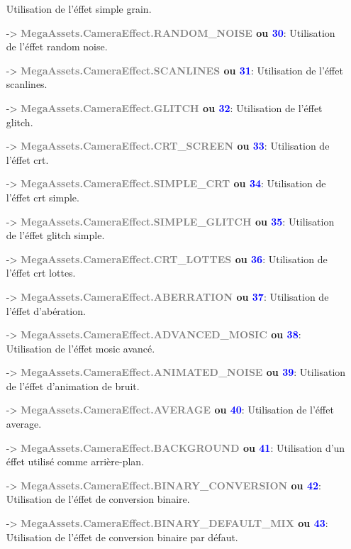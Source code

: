 \documentclass[a4paper, 11pt]{article}
\begin{document}
\begin{itemize}
		Utilisation de l'éffet simple grain.
		\item [-> \textbf{\textcolor{gray}{MegaAssets.CameraEffect.RANDOM\_NOISE} ou \textcolor{blue}{30}}:] 
		Utilisation de l'éffet random noise.
		\item [-> \textbf{\textcolor{gray}{MegaAssets.CameraEffect.SCANLINES} ou \textcolor{blue}{31}}:] 
		Utilisation de l'éffet scanlines.
		\item [-> \textbf{\textcolor{gray}{MegaAssets.CameraEffect.GLITCH} ou \textcolor{blue}{32}}:] 
		Utilisation de l'éffet glitch.
		\item [-> \textbf{\textcolor{gray}{MegaAssets.CameraEffect.CRT\_SCREEN} ou \textcolor{blue}{33}}:] 
		Utilisation de l'éffet crt.
		\item [-> \textbf{\textcolor{gray}{MegaAssets.CameraEffect.SIMPLE\_CRT} ou \textcolor{blue}{34}}:] 
		Utilisation de l'éffet crt simple.
		\item [-> \textbf{\textcolor{gray}{MegaAssets.CameraEffect.SIMPLE\_GLITCH} ou \textcolor{blue}
		{35}}:] Utilisation de l'éffet glitch simple.
		\item [-> \textbf{\textcolor{gray}{MegaAssets.CameraEffect.CRT\_LOTTES} ou \textcolor{blue}{36}}:] 
		Utilisation de l'éffet crt lottes.
		\item [-> \textbf{\textcolor{gray}{MegaAssets.CameraEffect.ABERRATION} ou \textcolor{blue}{37}}:] 
		Utilisation de l'éffet d'abération.
		\item [-> \textbf{\textcolor{gray}{MegaAssets.CameraEffect.ADVANCED\_MOSIC} ou \textcolor{blue}
		{38}}:] Utilisation de l'éffet mosic avancé.
		\item [-> \textbf{\textcolor{gray}{MegaAssets.CameraEffect.ANIMATED\_NOISE} ou \textcolor{blue}
		{39}}:] Utilisation de l'éffet d'animation de bruit.
		\item [-> \textbf{\textcolor{gray}{MegaAssets.CameraEffect.AVERAGE} ou \textcolor{blue}{40}}:] 
		Utilisation de l'éffet average.
		\item [-> \textbf{\textcolor{gray}{MegaAssets.CameraEffect.BACKGROUND} ou \textcolor{blue}{41}}:] 
		Utilisation d'un éffet utilisé comme arrière-plan.
		\item [-> \textbf{\textcolor{gray}{MegaAssets.CameraEffect.BINARY\_CONVERSION} ou \textcolor{blue}
		{42}}:] Utilisation de l'éffet de conversion binaire.
		\item [-> \textbf{\textcolor{gray}{MegaAssets.CameraEffect.BINARY\_DEFAULT\_MIX} ou \textcolor{blue}
		{43}}:] Utilisation de l'éffet de conversion binaire par défaut.

\end{itemize}
\end{document}
